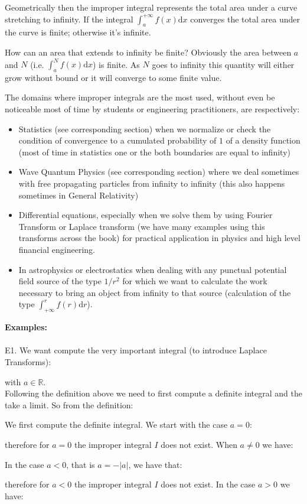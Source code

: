 	Geometrically then the improper integral represents the total area under a curve stretching to infinity. If the integral $\int_a^{+\infty} f(x)\mathrm{d}x$ converges the total area under the curve is finite; otherwise it's infinite.
	
	How can an area that extends to infinity be finite?  Obviously the area between $a$ and $N$ (i.e. $\int_a^N f(x)\mathrm{d}x$) is finite.  As $N$ goes to infinity this quantity will either grow without bound or it will converge to some finite value. 
	
	The domains where improper integrals are the most used, without even be noticeable most of time by students or engineering practitioners, are respectively:
	\begin{itemize}
		\item Statistics (see corresponding section) when we normalize or check the condition of convergence to a cumulated probability of $1$ of a density function (most of time in statistics one or the both boundaries are equal to infinity)

		\item Wave Quantum Physics (see corresponding section) where we deal sometimes with free propagating particles from infinity to infinity (this also happens sometimes in General Relativity)

		\item Differential equations, especially when we solve them by using Fourier Transform or Laplace transform (we have many examples using this transforms across the book) for practical application in physics and high level financial engineering.

		\item In astrophysics or electrostatics when dealing with any punctual potential field source of the type $1/r^2$  for which we want to calculate the work necessary to bring an object from infinity to that source (calculation of the type $\int_{+\infty}^{r} f(r)\mathrm{d}r$).
	\end{itemize}
	\begin{tcolorbox}[colframe=black,colback=white,sharp corners]
	\textbf{{\Large {}}Examples:}\\\\
	E1. We want compute the very important integral (to introduce Laplace Transforms):
	
	with $a\in\mathbb{R}$.\\
	
	Following the definition above we need to first compute a definite integral and the take a limit. So from the definition:
	
	We first compute the definite integral. We start with the case $a=0$:
	
	therefore for $a=0$ the improper integral $I$ does not exist. When $a\neq 0$ we have:
	
	In the case $a<0$, that is $a=-|a|$, we have that:
	
	therefore for $a<0$ the improper integral $I$ does not exist. In the case $a>0$ we have:
	
	\end{tcolorbox}
	
